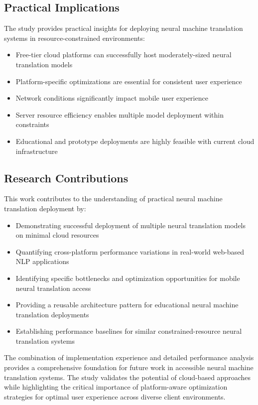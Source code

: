 \documentclass[conference]{IEEEtran}
\begin{document}
\subsection{Practical Implications}

The study provides practical insights for deploying neural machine translation systems in resource-constrained environments:

\begin{itemize}
    \item Free-tier cloud platforms can successfully host moderately-sized neural translation models
    \item Platform-specific optimizations are essential for consistent user experience
    \item Network conditions significantly impact mobile user experience
    \item Server resource efficiency enables multiple model deployment within constraints
    \item Educational and prototype deployments are highly feasible with current cloud infrastructure
\end{itemize}

\subsection{Research Contributions}

This work contributes to the understanding of practical neural machine translation deployment by:

\begin{itemize}
    \item Demonstrating successful deployment of multiple neural translation models on minimal cloud resources
    \item Quantifying cross-platform performance variations in real-world web-based NLP applications
    \item Identifying specific bottlenecks and optimization opportunities for mobile neural translation access
    \item Providing a reusable architecture pattern for educational neural machine translation deployments
    \item Establishing performance baselines for similar constrained-resource neural translation systems
\end{itemize}

The combination of implementation experience and detailed performance analysis provides a comprehensive foundation for future work in accessible neural machine translation systems. The study validates the potential of cloud-based approaches while highlighting the critical importance of platform-aware optimization strategies for optimal user experience across diverse client environments.
\end{document}
